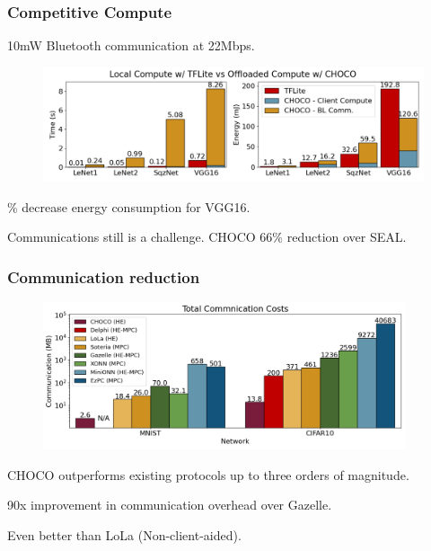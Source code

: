 \documentclass[10pt,handout]{beamer}
\begin{document}
\begin{frame}
    \frametitle{Competitive Compute}
    10mW Bluetooth communication at 22Mbps.

    \begin{figure}
        \includegraphics[width=1\textwidth]{energy.png}
    \end{figure}
\% decrease energy consumption for VGG16.

    Communications still is a challenge. CHOCO 66\% reduction over SEAL.


\end{frame}




\begin{frame}
    \frametitle{Communication reduction}

    \begin{figure}
        \includegraphics[width=0.95\textwidth]{comunication.png}
    \end{figure}
CHOCO outperforms existing protocols up to three orders of magnitude.

    90x improvement in communication overhead over Gazelle.
\pause

    Even better than LoLa (Non-client-aided).
\end{frame}
%
%
%
\end{document}
